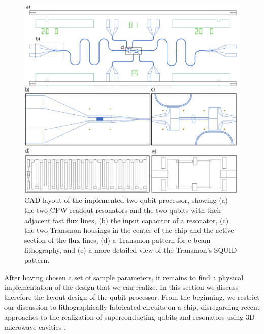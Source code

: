 \begin{figure}[ht!]
	\centering
	\includegraphics[width=\textwidth]{./material/figures/2-qubit-processor/fabrication/qubit_processor_layout}
	\caption[]{CAD layout of the implemented two-qubit processor, showing (a) the two CPW readout resonators and the two qubits with their adjacent fast flux lines, (b) the input capacitor of a resonator, (c) the two Transmon housings in the center of the chip and the active section of the flux lines, (d) a Transmon pattern for e-beam lithography, and (e) a more detailed view of the Transmon's SQUID pattern.}
	\label{fig:processor_fabrication}
\end{figure}

After having chosen a set of sample parameters, it remains to find a physical implementation of the design that we can realize. In this section we discuss therefore the layout design of the qubit processor. From the beginning, we restrict our discussion to lithographically fabricated circuits on a chip, disregarding recent approaches to the realization of superconducting qubits and resonators using 3D microwave cavities \citep{paik_observation_2011}.

\smallskip

